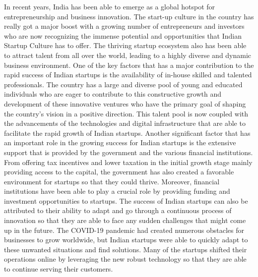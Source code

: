 \documentclass[12pt]{article}
\begin{document}
In recent years, India has been able to emerge as a global hotspot for entrepreneurship and business innovation. The start-up culture in the country has really got a major boost with a growing number of entrepreneurs and investors who are now recognizing the immense potential and opportunities that Indian Startup Culture has to offer. The thriving startup ecosystem also has been able to attract talent from all over the world, leading to a highly diverse and dynamic business environment.
One of the key factors that has a major contribution to the rapid success of Indian startups is the availability of in-house skilled and talented professionals. The country has a large and diverse pool of young and educated individuals who are eager to contribute to this constructive growth and 
development of these innovative ventures who have the primary goal of shaping the country's vision in a positive direction. This talent pool is now coupled with the advancements of the technologies and digital infrastructure that are able to facilitate the rapid growth of Indian startups. 
Another significant factor that has an important role in the growing success for Indian startups is the extensive support that is provided by the government and the various financial institutions. From offering tax incentives and lower taxation in the initial growth stage mainly providing access to the capital, the government has also created a favorable environment for startups so that they could thrive. 
Moreover, financial institutions have been able to play a crucial role by providing funding and investment opportunities to startups. The success of Indian startups can also be attributed to their ability to adapt and go through a continuous process of innovation so that they are able to face any sudden challenges that might come up in the future. The COVID-19 pandemic had created numerous obstacles for businesses to grow worldwide, but Indian startups were able to quickly adapt to these unwanted situations and find solutions. Many of the startups shifted their operations online by leveraging the new robust technology so that they are able to continue serving their customers.
\end{document}
